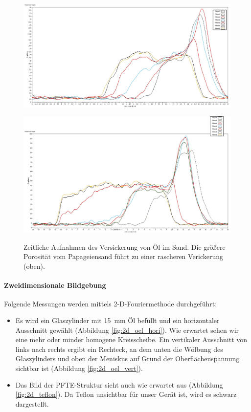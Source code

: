 \documentclass[a4paper]{scrartcl} %
\begin{document}
\begin{figure}[htbp]
	{
		\centering
		\includegraphics[width=.8 \linewidth]{./Resources/Teil_3/oeldiff_chinchilla.jpg}
		\label{fig:oeldiff_chinchilla}
	\vspace{1cm}
	
		\centering
		\includegraphics[width=.8 \linewidth]{./Resources/Teil_3/oeldiff_papa.jpg}
		\label{fig:oeldiff_papa}
	}	
		\caption{Zeitliche Aufnahmen des Versickerung von Öl im Sand. Die größere Porosität vom Papageiensand führt zu einer rascheren Verickerung (oben).}
		\label{fig:oel_diff}
	
\end{figure}

\paragraph{Zweidimensionale Bildgebung}

Folgende Messungen werden mittels 2-D-Fouriermethode durchgeführt:

\begin{itemize}
	\item Es wird ein Glaszylinder mit \SI{15}{mm} Öl befüllt und ein horizontaler Ausschnitt gewählt (Abbildung \ref{fig:2d_oel_hori}). Wie erwartet sehen wir eine mehr oder minder homogene Kreisscheibe. Ein vertikaler Ausschnitt von links nach rechts ergibt ein Rechteck, an dem unten die Wölbung des Glaszylinders und oben der Meniskus auf Grund der Oberflächenspannung sichtbar ist (Abbildung \ref{fig:2d_oel_vert}).
	\item Das Bild der PFTE-Struktur sieht auch wie erwartet aus (Abbildung \ref{fig:2d_teflon}). Da Teflon unsichtbar für unser Gerät ist, wird es schwarz dargestellt.
\end{itemize}
\end{document}

